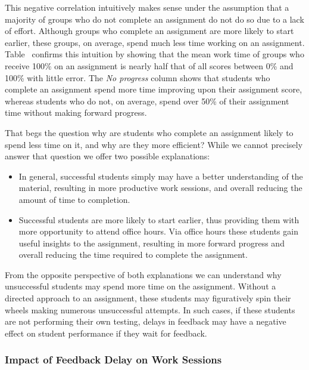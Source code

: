 This negative correlation intuitively makes sense under the assumption that a
majority of groups who do not complete an assignment do not do so due to a lack
of effort. Although groups who complete an assignment are more
likely to start earlier, these groups, on average, spend much less time working
on an assignment. Table~ confirms this intuition by
showing that the mean work time of groups who receive 100\% on an assignment is
nearly half that of all scores between 0\% and 100\% with little error. The
\emph{No progress} column shows that students who complete an assignment spend
more time improving upon their assignment score, whereas students who do not,
on average, spend over 50\% of their assignment time without making forward
progress.

That begs the question why are students who complete an assignment likely to
spend less time on it, and why are they more efficient? While we cannot
precisely answer that question we offer two possible explanations:

\begin{itemize}
\item In general, successful students simply may have a better understanding of
  the material, resulting in more productive work sessions, and overall
  reducing the amount of time to completion.
\item Successful students are more likely to start earlier, thus providing them
  with more opportunity to attend office hours. Via office hours these students
  gain useful insights to the assignment, resulting in more forward progress
  and overall reducing the time required to complete the assignment.
\end{itemize}

From the opposite perspective of both explanations we can understand why
unsuccessful students may spend more time on the assignment. Without a directed
approach to an assignment, these students may figuratively spin their wheels
making numerous unsuccessful attempts. In such cases, if these students are not
performing their own testing, delays in feedback may have a negative effect on
student performance if they wait for feedback.


\subsubsection{Impact of Feedback Delay on Work Sessions}

